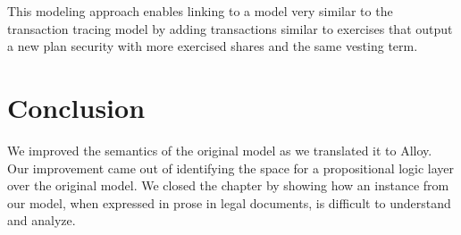 This modeling approach enables linking to a model very similar to the transaction tracing model by adding \glspl{transaction} similar to \glspl{exercise} that output a new plan \gls{security} with more exercised shares and the same vesting term.

\section{Conclusion}

We improved the semantics of the original model as we translated it to Alloy. Our improvement came out of identifying the space for a propositional logic layer over the original model. We closed the chapter by showing how an instance from our model, when expressed in prose in legal documents, is difficult to understand and analyze.
